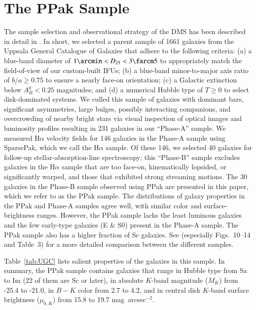 \documentclass[traditabstract]{aa} %
\begin{document}
\section{The PPak Sample}
\label{sec:Sample}

The sample selection and observational strategy of the DMS has been described in
detail in .  In short, we selected a parent sample of
1661 galaxies from the Uppsala General Catalogue of Galaxies
\citep[UGC;][]{nilson1973} that adhere to the following criteria: (a) a
blue-band diameter of $1\arcmin < D_{25} < 3\farcm5$ to appropriately match the
field-of-view of our custom-built IFUs; (b) a blue-band minor-to-major axis
ratio of $b/a \geqslant 0.75$ to ensure a nearly face-on orientation; (c) a
Galactic extinction below $A^g_B<0.25$ magnitudes; and (d) a numerical Hubble
type of $T\geqslant0$ to select disk-dominated systems.  We culled this sample
of galaxies with dominant bars, significant asymmetries, large bulges, possibly
interacting companions, and overcrowding of nearby bright stars via visual
inspection of optical images and luminosity profiles resulting in 231 galaxies
in our ``Phase-A'' sample.  We measured H$\alpha$ velocity fields for 146
galaxies in the Phase-A sample using SparsePak, which we call the H$\alpha$ sample.
Of these 146, we selected 40 galaxies for follow-up stellar-absorption-line spectroscopy;
this ``Phase-B'' sample excludes galaxies in the H$\alpha$ sample that are too
face-on, kinematically lopsided, or significantly warped, and those that
exhibited strong streaming motions.  The 30 galaxies in the Phase-B sample
observed using PPak are presented in this paper, which we refer to as the PPak
sample.
%
The distributions of galaxy properties in the PPak and Phase-A samples agree well, with
similar color and surface-brightness ranges. However, the PPak sample lacks the
least luminous galaxies and the few early-type galaxies (E \& S0) present in the
Phase-A sample. The PPak sample also has a higher fraction of Sc galaxies.
See  (especially Figs.~10--14 and Table~3) for a more detailed
comparison between the different samples.

Table~\ref{tab:UGC} lists salient properties of the galaxies in this
sample.  In summary, the PPak sample contains galaxies that range in Hubble type
from Sa to Im (22 of them are Sc or later), in absolute $K$-band magnitude
($M_K$) from -25.4 to -21.0, in $B-K$ color from 2.7 to 4.2, and in
central disk $K$-band surface brightness ($\mu_{0,K}$) from 15.8 to 19.7
mag~arcsec$^{-2}$.
\end{document}
